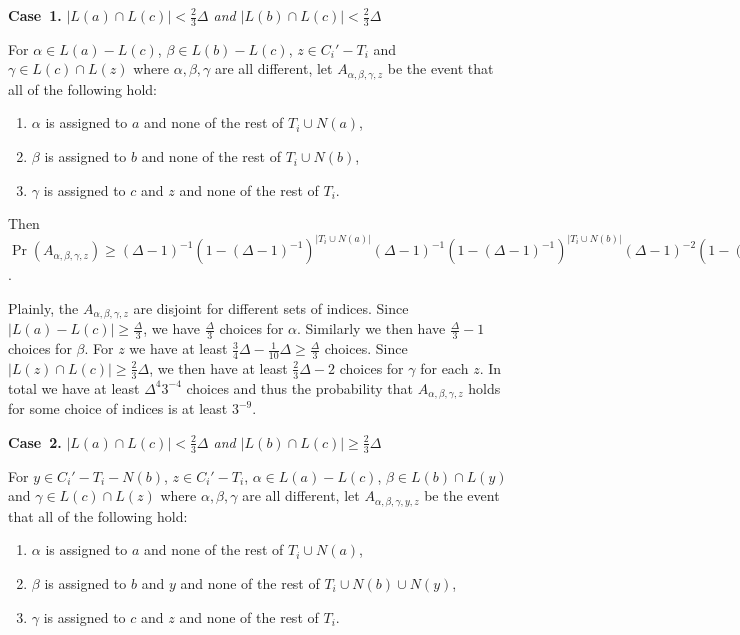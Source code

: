 \documentclass[12pt]{amsart}
\theoremstyle{plain}
\theoremstyle{definition}
\theoremstyle{remark}
\newcommand{\card}[1]{\left|#1\right|}
\begin{document}
{\bf Case~1.} {\it $\card{L(a) \cap L(c)} < \frac23 \Delta$ and $\card{L(b) \cap
L(c)} < \frac23 \Delta$}

For $\alpha \in L(a) - L(c)$, $\beta \in L(b) - L(c)$, $z \in C_i' - T_i$ and
$\gamma \in L(c) \cap L(z)$ where $\alpha, \beta, \gamma$ are all different, let
$A_{\alpha, \beta, \gamma, z}$ be the event that all of the following hold:

\begin{enumerate}
  \item $\alpha$ is assigned to $a$ and none of the rest of $T_i \cup N(a)$,
  \item $\beta$ is assigned to $b$ and none of the rest of $T_i \cup N(b)$,
  \item $\gamma$ is assigned to $c$ and $z$ and none of the rest of $T_i$.
\end{enumerate}

Then $\Pr(A_{\alpha, \beta, \gamma, z}) \geq (\Delta-1)^{-1}(1-
(\Delta-1)^{-1})^{\card{T_i \cup N(a)}}(\Delta-1)^{-1}(1-
(\Delta-1)^{-1})^{\card{T_i \cup N(b)}}(\Delta-1)^{-2}(1-
(\Delta-1)^{-1})^{\card{T_i}} \geq (\Delta-1)^{-4}3^{-5}$.

Plainly, the $A_{\alpha, \beta, \gamma, z}$ are disjoint for different sets of
indices.  Since $\card{L(a) - L(c)} \geq \frac{\Delta}{3}$, we have
$\frac{\Delta}{3}$ choices for $\alpha$.  Similarly we then have
$\frac{\Delta}{3} - 1$ choices for $\beta$.  For $z$ we have at least $\frac34
\Delta - \frac{1}{10}\Delta \geq \frac{\Delta}{3}$ choices.  Since $\card{L(z)
\cap L(c)} \geq \frac23 \Delta$, we then have at least $\frac23\Delta - 2$
choices for $\gamma$ for each $z$.  In total we have at least $\Delta^4 3^{-4}$
choices and thus the probability that $A_{\alpha, \beta, \gamma, z}$ holds for
some choice of indices is at least $3^{-9}$.

{\bf Case~2.} {\it $\card{L(a) \cap L(c)} < \frac23 \Delta$ and $\card{L(b) \cap
L(c)} \geq \frac23 \Delta$}

For $y \in C_i' - T_i - N(b)$, $z \in C_i' - T_i$, $\alpha \in L(a) - L(c)$,
$\beta \in L(b) \cap L(y)$ and $\gamma \in L(c) \cap L(z)$ where $\alpha, \beta,
\gamma$ are all different, let $A_{\alpha, \beta, \gamma, y, z}$ be the event
that all of the following hold:

\begin{enumerate}
  \item $\alpha$ is assigned to $a$ and none of the rest of $T_i \cup N(a)$,
  \item $\beta$ is assigned to $b$ and $y$ and none of the rest of $T_i \cup
  N(b) \cup N(y)$,
  \item $\gamma$ is assigned to $c$ and $z$ and none of the rest of $T_i$.
\end{enumerate}
\end{document}
